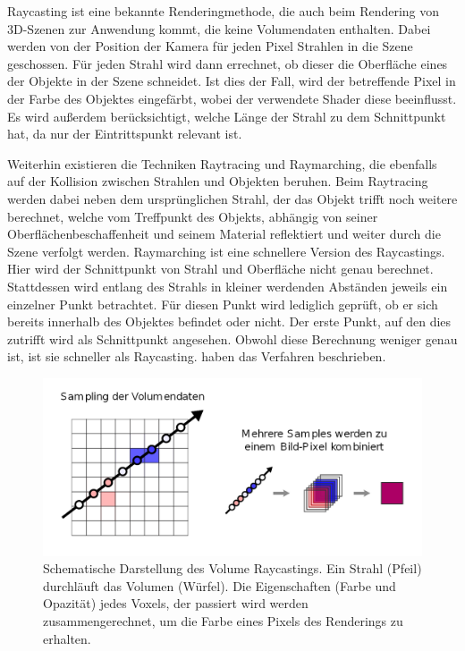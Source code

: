 Raycasting ist eine bekannte Renderingmethode, die auch beim Rendering von 3D-Szenen zur Anwendung kommt, die keine Volumendaten enthalten.
Dabei werden von der Position der Kamera für jeden Pixel Strahlen in die Szene geschossen. Für jeden Strahl wird dann errechnet, ob dieser die Oberfläche eines der Objekte in der Szene schneidet. Ist dies der Fall, wird der betreffende Pixel in der Farbe des Objektes eingefärbt, wobei der verwendete Shader diese beeinflusst. Es wird außerdem berücksichtigt, welche Länge der Strahl zu dem Schnittpunkt hat, da nur der Eintrittspunkt relevant ist.

Weiterhin existieren die Techniken Raytracing und Raymarching, die ebenfalls auf der Kollision zwischen Strahlen und Objekten beruhen.
Beim Raytracing werden dabei neben dem ursprünglichen Strahl, der das Objekt trifft noch weitere berechnet, welche vom Treffpunkt des Objekts, abhängig von seiner Oberflächenbeschaffenheit und seinem Material reflektiert und weiter durch die Szene verfolgt werden.
Raymarching ist eine schnellere Version des Raycastings. 
Hier wird der Schnittpunkt von Strahl und Oberfläche nicht genau berechnet. Stattdessen wird entlang des Strahls in kleiner werdenden Abständen jeweils ein einzelner Punkt betrachtet. Für diesen Punkt wird lediglich geprüft, ob er sich bereits innerhalb des Objektes befindet oder nicht. Der erste Punkt, auf den dies zutrifft wird als Schnittpunkt angesehen. Obwohl diese Berechnung weniger genau ist, ist sie schneller als Raycasting.
\cite{Hart89} haben das Verfahren beschrieben. 

\begin{figure}[!htb]
	\centering
	\includegraphics[width=0.7\linewidth]{images/rayCasting.png}
	\caption{Schematische Darstellung des Volume Raycastings. Ein Strahl (Pfeil) durchläuft das Volumen (Würfel). Die Eigenschaften (Farbe und Opazität) jedes Voxels, der passiert wird werden zusammengerechnet, um die Farbe eines Pixels des Renderings zu erhalten.}
	\label{img:rayCasting}
\end{figure}
\FloatBarrier

